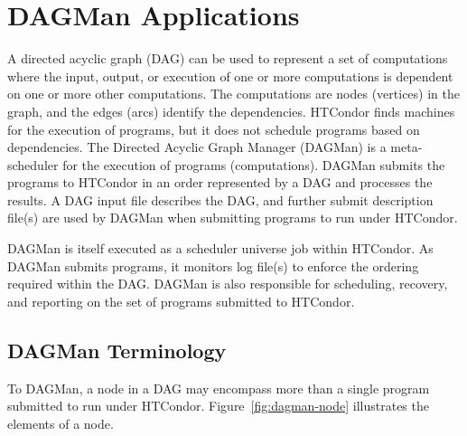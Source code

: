 \section{\label{sec:DAGMan}DAGMan Applications}

A directed acyclic graph (DAG) can be used to represent a set of computations
where the input, output, or execution of one or more computations
is dependent on one or more other computations.
The computations are nodes (vertices) in the graph,
and the edges (arcs) identify the dependencies.
HTCondor finds machines for the execution of programs, but it
does not schedule programs based on dependencies.
The Directed Acyclic Graph Manager (DAGMan) is a meta-scheduler for 
the execution of programs (computations). 
DAGMan submits the programs to HTCondor in an order represented by
a DAG and processes the results.
A DAG input file describes the DAG, and
further submit description file(s) are used by DAGMan
when submitting programs to run under HTCondor.

DAGMan is itself executed as a scheduler universe job
within HTCondor.
As DAGMan submits programs, it monitors log file(s) 
to enforce the ordering required within the DAG.
DAGMan is also responsible for scheduling, recovery, and reporting
on the set of programs submitted to HTCondor.

\subsection{\label{sec:DAGTerminology}DAGMan Terminology}

To DAGMan, a node in a DAG may encompass more than a single
program submitted to run under HTCondor.
Figure~\ref{fig:dagman-node} illustrates the elements of a node.

